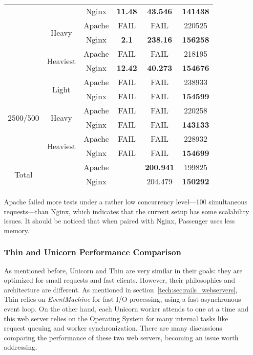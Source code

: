 \begin{table}[ht]
\begin{tabular}{|c|c|c|c|c|c|}
 &  & Nginx & \textbf{11.48} & \textbf{43.546} & \textbf{141438}\\\cline{2-6}
 & \multirow{2}{*}{Heavy} & Apache & FAIL & FAIL & 220525\\\cline{3-6}
 &  & Nginx & \textbf{2.1} & \textbf{238.16} & \textbf{156258}\\\cline{2-6}
 & \multirow{2}{*}{Heaviest} & Apache & FAIL & FAIL & 218195\\\cline{3-6}
 &  & Nginx & \textbf{12.42} & \textbf{40.273} & \textbf{154676}\\\hline
\multirow{6}{*}{2500/500} & \multirow{2}{*}{Light} & Apache & FAIL & FAIL & 238933\\\cline{3-6}
 &  & Nginx & FAIL & FAIL & \textbf{154599}\\\cline{2-6}
 & \multirow{2}{*}{Heavy} & Apache & FAIL & FAIL & 220258\\\cline{3-6}
 &  & Nginx & FAIL & FAIL & \textbf{143133}\\\cline{2-6}
 & \multirow{2}{*}{Heaviest} & Apache & FAIL & FAIL & 228932\\\cline{3-6}
 &  & Nginx & FAIL & FAIL & \textbf{154699}\\\hline
\multirow{2}{*}{Total} &  & Apache &  & \textbf{200.941} & 199825\\\cline{2-6}
 &  & Nginx &  & 204.479 & \textbf{150292}\\\hline
  \end{tabular}
  
  \label{tab:passenger_benchmark}
\end{table}

Apache failed more tests under a rather low concurrency level---100 simultaneous requests---than Nginx, which indicates that the current setup has some scalability issues. It should be noticed that when paired with Nginx, Passenger uses less memory. 

\subsubsection{Thin and Unicorn Performance Comparison}
As mentioned before, Unicorn and Thin are very similar in their goals: they are optimized for small requests and fast clients. However, their philosophies and architecture are different. As mentioned in section~\ref{tech:sec:rails_webservers}, Thin relies on \textit{EventMachine} for fast I/O processing, using a fast asynchronous event loop. On the other hand, each Unicorn worker attends to one at a time and this web server relies on the Operating System for many internal tasks like request queuing and worker synchronization. There are many discussions comparing the performance of these two web servers, becoming an issue worth addressing.

